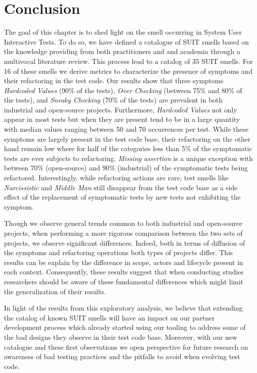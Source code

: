 \section{Conclusion}

The goal of this chapter is to shed light on the smell occurring in System User Interactive Tests. To do so, we have defined a catalogue of SUIT smells based on the knowledge providing from both practitioners and and academia through a multivocal literature review. This process lead to a catalog of 35 SUIT smells. For 16 of these smells we derive metrics to characterize the presence of symptoms and their refactoring in the test code. Our results show that three symptoms \emph{Hardcoded Values} (90\% of the tests), \emph{Over Checking} (between 75\% and 80\% of the tests), and \emph{Sneaky Checking} (70\% of the tests) are prevalent in both industrial and open-source projects. Furthermore, \emph{Hardcoded Values} not only appear in most tests but when they are present tend to be in a large quantity with median values ranging between 50 and 70 occurrences per test. While these symptoms are largely present in the test code base, their refactoring on the other hand remain low where for half of the categories less than 5\% of the symptomatic tests are ever subjects to refactoring. \emph{Missing assertion} is a unique exception with between 70\% (open-source) and 90\% (industrial) of the symptomatic tests being refactored. Interestingly, while refactoring actions are rare, test smells like \emph{Narcissistic} and \emph{Middle Man} still disappear from the test code base as a side effect of the replacement of symptomatic tests by new tests not exhibiting the symptom.

Though we observe general trends common to both industrial and open-source projects, when performing a more rigorous comparison between the two sets of projects, we observe significant differences. Indeed, both in terms of diffusion of the symptoms and refactoring operations both types of projects differ. This results can be explain by the difference in scope, actors and lifecycle present in each context. Consequently, these results suggest that when conducting studies researchers should be aware of these fundamental differences which might limit the generalization of their results.

In light of the results from this exploratory analysis, we believe that extending the catalog of known SUIT smells will have an impact on our partner development process which already started using our tooling to address some of the bad designs they observe in their test code base. Moreover, with our new catalogue and these first observations we open perspective for future research on awareness of bad testing practices and the pitfalls to avoid when evolving test code. 